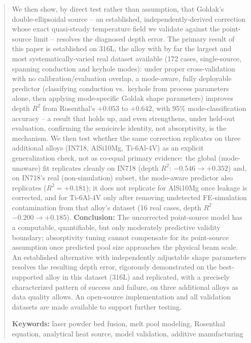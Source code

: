 \documentclass[12pt]{article}
\begin{document}
\begin{abstract}
We then show, by direct test rather than assumption, that Goldak's double-ellipsoidal source \cite{goldak1984} -- an established, independently-derived correction whose exact quasi-steady temperature field we validate against the point-source limit -- resolves the diagnosed depth error. The primary result of this paper is established on 316L, the alloy with by far the largest and most systematically-varied real dataset available (172 cases, single-source, spanning conduction and keyhole modes): under proper cross-validation with no calibration/evaluation overlap, a mode-aware, fully deployable predictor (classifying conduction vs.\ keyhole from process parameters alone, then applying mode-specific Goldak shape parameters) improves depth $R^2$ from Rosenthal's $+0.053$ to $\mathbf{+0.642}$, with 95\% mode-classification accuracy -- a result that holds up, and even strengthens, under held-out evaluation, confirming the semicircle identity, not absorptivity, is the mechanism. We then test whether the same correction replicates on three additional alloys (IN718, AlSi10Mg, Ti-6Al-4V) as an explicit generalization check, not as co-equal primary evidence: the global (mode-unaware) fit replicates cleanly on IN718 (depth $R^2$: $-0.546\rightarrow+0.352$) and, on IN718's real (non-simulation) subset, the mode-aware predictor also replicates ($R^2=+0.181$); it does not replicate for AlSi10Mg once leakage is corrected, and for Ti-6Al-4V only after removing undetected FE-simulation contamination from that alloy's dataset (16 real cases, depth $R^2$ $-0.200\rightarrow+0.185$).
\textbf{Conclusion:} The uncorrected point-source model has a computable, quantifiable, but only moderately predictive validity boundary; absorptivity tuning cannot compensate for its point-source assumption once predicted pool size approaches the physical beam scale. An established alternative with independently adjustable shape parameters resolves the resulting depth error, rigorously demonstrated on the best-supported alloy in this dataset (316L) and replicated, with a precisely characterized pattern of success and failure, on three additional alloys as data quality allows. An open-source implementation and all validation datasets are made available to support further testing.

\vspace{0.5em}
\noindent\textbf{Keywords:} laser powder bed fusion, melt pool modeling, Rosenthal equation, analytical heat source, model validation, additive manufacturing
\end{abstract}
\end{document}
